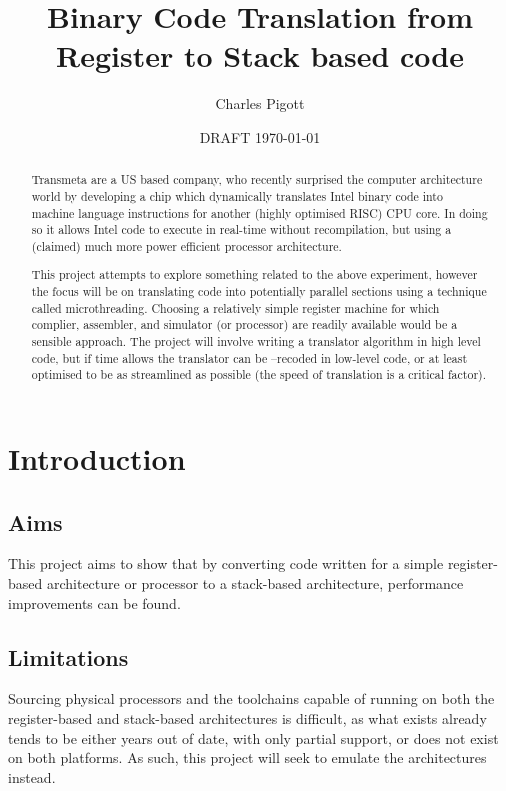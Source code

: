 \documentclass[11pt,a4paper,notitlepage]{report}
\title{Binary Code Translation from Register to Stack based code}
\author{Charles Pigott}
\date{DRAFT \today}
\begin{document}
\maketitle

\begin{abstract}
Transmeta are a US based company, who recently surprised the computer
architecture world by developing a chip which dynamically translates Intel
binary code into machine language instructions for another (highly optimised
RISC) CPU core. In doing so it allows Intel code to execute in real-time without
recompilation, but using a (claimed) much more power efficient processor
architecture.

This project attempts to explore something related to the above experiment,
however the focus will be on translating code into potentially parallel sections
using a technique called microthreading. Choosing a relatively simple register
machine for which complier, assembler, and simulator (or processor) are readily
available would be a sensible approach. The project will involve writing a
translator algorithm in high level code, but if time allows the translator can
be –recoded in low-level code, or at least optimised to be as streamlined as
possible (the speed of translation is a critical factor).
\end{abstract}

\cleardoublepage

\tableofcontents

\chapter{Introduction}
\section{Aims}
This project aims to show that by converting code written for a simple
register-based architecture or processor to a stack-based architecture,
performance improvements can be found.

\section{Limitations}
Sourcing physical processors and the toolchains capable of running on both the
register-based and stack-based architectures is difficult, as what exists
already tends to be either years out of date, with only partial support, or does
not exist on both platforms. As such, this project will seek to emulate the
architectures instead.
\end{document}
